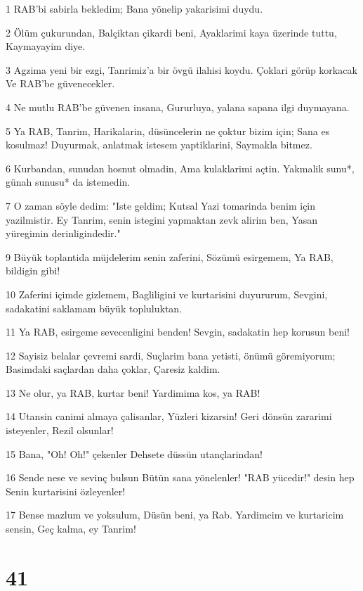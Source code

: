 \par 1 RAB'bi sabirla bekledim; Bana yönelip yakarisimi duydu.
\par 2 Ölüm çukurundan, Balçiktan çikardi beni, Ayaklarimi kaya üzerinde tuttu, Kaymayayim diye.
\par 3 Agzima yeni bir ezgi, Tanrimiz'a bir övgü ilahisi koydu. Çoklari görüp korkacak Ve RAB'be güvenecekler.
\par 4 Ne mutlu RAB'be güvenen insana, Gururluya, yalana sapana ilgi duymayana.
\par 5 Ya RAB, Tanrim, Harikalarin, düsüncelerin ne çoktur bizim için; Sana es kosulmaz! Duyurmak, anlatmak istesem yaptiklarini, Saymakla bitmez.
\par 6 Kurbandan, sunudan hosnut olmadin, Ama kulaklarimi açtin. Yakmalik sunu*, günah sunusu* da istemedin.
\par 7 O zaman söyle dedim: "Iste geldim; Kutsal Yazi tomarinda benim için yazilmistir. Ey Tanrim, senin istegini yapmaktan zevk alirim ben, Yasan yüregimin derinligindedir."
\par 9 Büyük toplantida müjdelerim senin zaferini, Sözümü esirgemem, Ya RAB, bildigin gibi!
\par 10 Zaferini içimde gizlemem, Bagliligini ve kurtarisini duyururum, Sevgini, sadakatini saklamam büyük topluluktan.
\par 11 Ya RAB, esirgeme sevecenligini benden! Sevgin, sadakatin hep korusun beni!
\par 12 Sayisiz belalar çevremi sardi, Suçlarim bana yetisti, önümü göremiyorum; Basimdaki saçlardan daha çoklar, Çaresiz kaldim.
\par 13 Ne olur, ya RAB, kurtar beni! Yardimima kos, ya RAB!
\par 14 Utansin canimi almaya çalisanlar, Yüzleri kizarsin! Geri dönsün zararimi isteyenler, Rezil olsunlar!
\par 15 Bana, "Oh! Oh!" çekenler Dehsete düssün utançlarindan!
\par 16 Sende nese ve sevinç bulsun Bütün sana yönelenler! "RAB yücedir!" desin hep Senin kurtarisini özleyenler!
\par 17 Bense mazlum ve yoksulum, Düsün beni, ya Rab. Yardimcim ve kurtaricim sensin, Geç kalma, ey Tanrim!

\chapter{41}

